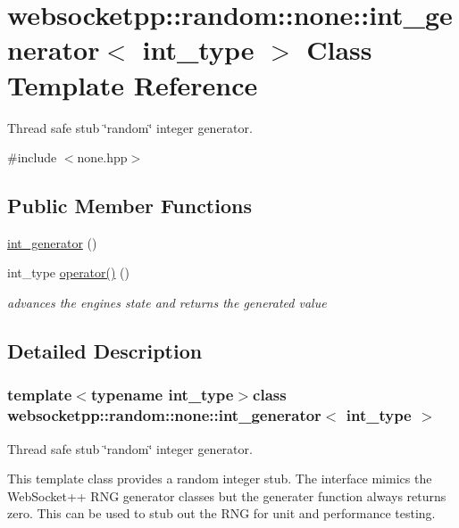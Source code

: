 \hypertarget{classwebsocketpp_1_1random_1_1none_1_1int__generator}{}\section{websocketpp\+:\+:random\+:\+:none\+:\+:int\+\_\+generator$<$ int\+\_\+type $>$ Class Template Reference}
\label{classwebsocketpp_1_1random_1_1none_1_1int__generator}


Thread safe stub \char`\"{}random\char`\"{} integer generator.  




{\ttfamily \#include $<$none.\+hpp$>$}

\subsection*{Public Member Functions}
\begin{DoxyCompactItemize}
\item 
\hyperlink{classwebsocketpp_1_1random_1_1none_1_1int__generator_a74f4d568cdcfbd159819cb94b0932b70}{int\+\_\+generator} ()
\item 
int\+\_\+type \hyperlink{classwebsocketpp_1_1random_1_1none_1_1int__generator_aecc2404c6eef19dbb5e585344bdd9069}{operator()} ()
\begin{DoxyCompactList}\small\item\em advances the engine\textquotesingle{}s state and returns the generated value \end{DoxyCompactList}\end{DoxyCompactItemize}


\subsection{Detailed Description}
\subsubsection*{template$<$typename int\+\_\+type$>$class websocketpp\+::random\+::none\+::int\+\_\+generator$<$ int\+\_\+type $>$}

Thread safe stub \char`\"{}random\char`\"{} integer generator. 

This template class provides a random integer stub. The interface mimics the Web\+Socket++ R\+N\+G generator classes but the generater function always returns zero. This can be used to stub out the R\+N\+G for unit and performance testing.

